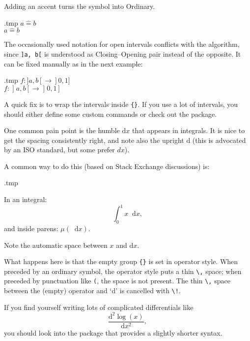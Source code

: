\begin{gotcha}
Adding an accent turns the symbol into Ordinary.
%
\begin{VerbatimOut}{\jobname.tmp}
$a \hat= b$\\
$a \mathrel{\hat=} b$
\end{VerbatimOut}
\ShowExample
\end{gotcha}

\begin{gotcha}
The occasionally used notation for open intervals conflicts with the algorithm,
since \verb|]a, b[| is understood as Closing--Opening pair instead of the opposite.
It can be fixed manually as in the next example:
%
\begin{VerbatimOut}{\jobname.tmp}
$f \colon ]a, b[ \to ]0, 1]$\\
$f \colon \mathopen]a, b\mathclose[
    \to \mathopen]0, 1]$
\end{VerbatimOut}
\ShowExample
%
A quick fix is to wrap the intervals inside \verb|{}|.
If you use a lot of intervals,
you should either define some custom commands or check out the  package.
\end{gotcha}



One common pain point is the humble $\mathrm dx$ that appears in integrals.
It is nice to get the spacing consistently right,
and note also the upright $\mathrm d$ (this is advocated by an ISO standard, but some prefer $dx$).

A common way to do this (based on Stack Exchange discussions) is:
%
\begin{VerbatimOut}{\jobname.tmp}
\newcommand{\diff}{\mathop{}\!\mathrm{d}}

In an integral:
\[
\int_0^1 x \diff x,
\]
and inside parens: $\mu(\diff x)$.
\end{VerbatimOut}
\ShowExample
%
Note the automatic space between $x$ and $\mathrm dx$.

What happens here is that the empty group \verb|{}| is set in operator style.
When preceded by an ordinary symbol, the operator style puts a thin \verb|\,| space;
when preceded by punctuation like \verb|(|, the space is not present.
The thin \verb|\,| space between the (empty) operator and `d' is cancelled with \verb|\!|.

If you find yourself writing lots of complicated differentials like
\[
\frac{\mathrm d^2 \log(x)}{\mathrm dx^2},
\]
you should look into the  package
that provides a slightly shorter syntax.



